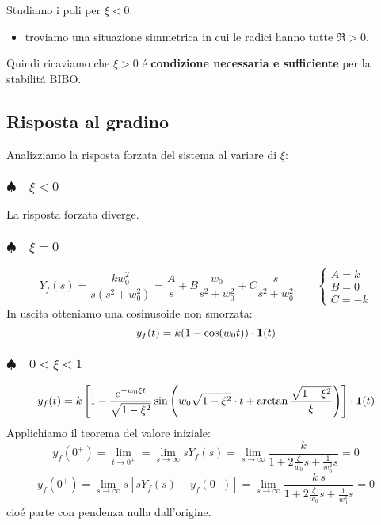 \documentclass[../main.tex]{subfiles}
\begin{document}
		Studiamo i poli per $ \xi < 0 $:
		\begin{itemize}
			\item troviamo una situazione simmetrica in cui le radici hanno tutte $ \Re > 0 $.
		\end{itemize}
		Quindi ricaviamo che $ \xi > 0 $ \'e \textbf{condizione necessaria e sufficiente} per la stabilit\'a BIBO.
		
	\subsection{Risposta al gradino}
		Analizziamo la risposta forzata del sistema al variare di $ \xi $:
	
	\subsubsection{$ \spadesuit \quad \xi < 0 $}
		La risposta forzata diverge.
		
	\subsubsection{$ \spadesuit \quad \xi = 0 $}
		\[
			Y_f(s) = \frac{kw_0^2}{s(s^2+w_0^2)} = \frac{A}{s} + B\frac{w_0}{s^2+w_0^2} + C\frac{s}{s^2+w_0^2}
			\qquad
			\begin{cases}
				A = k\\
				B = 0\\
				C = -k
			\end{cases}
		\]
		In uscita otteniamo una cosinusoide non smorzata:
		\[
			y_f(t) = k(1-\cos(w_0t)) \cdot \textbf{1}(t)
		\]
		
	\subsubsection{$ \spadesuit \quad 0 < \xi < 1 $}
		\[ 
			y_f(t) = k \left[ 1 - \frac{e^{-w_0\xi t}}{\sqrt{1-\xi^2}} \sin\left( w_0 \sqrt{1-\xi^2} \cdot t + \arctan \frac{\sqrt{1-\xi^2}}{\xi} \right) \right] \cdot \textbf{1}(t) 
		\]
		Applichiamo il teorema del valore iniziale:
		\[ 
			y_f(0^+) = \lim_{t \to 0^+} = \lim_{s \to \infty} s Y_f(s) = \lim_{s \to \infty} \frac{k}{1+2\frac{\xi}{w_0}s+\frac{1}{w_0^2}s} = 0
		\]
		\[ 
			\dot y_f(0^+) = \lim_{s \to \infty} s \left[ sY_f(s) - y_f(0^-) \right] = \lim_{s \to \infty} \frac{k\ s}{1+2\frac{\xi}{w_0}s+\frac{1}{w_0^2}s} = 0
		\]
		cio\'e parte con pendenza nulla dall'origine.
		
\end{document}
